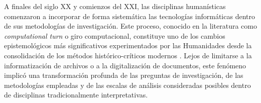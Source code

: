

A finales del siglo XX y comienzos del XXI, las disciplinas humanísticas comenzaron a incorporar de forma sistemática las tecnologías informáticas dentro de sus metodologías de investigación. Este proceso, conocido en la literatura como \textit{computational turn} o giro computacional, constituye uno de los cambios epistemológicos más significativos experimentados por las Humanidades desde la consolidación de los métodos histórico-críticos modernos \citep{berry2011computational}. Lejos de limitarse a la informatización de archivos o a la digitalización de documentos, este fenómeno implicó una transformación profunda de las preguntas de investigación, de las metodologías empleadas y de las escalas de análisis consideradas posibles dentro de disciplinas tradicionalmente interpretativas.

